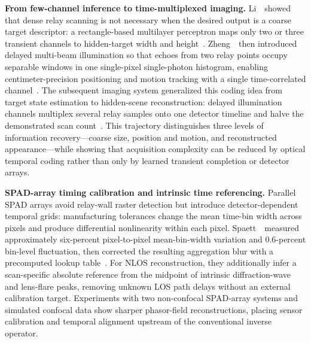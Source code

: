 \vspace{0.8mm}
\noindent \textbf{From few-channel inference to time-multiplexed imaging.}
Li~\etal~showed that dense relay scanning is not necessary when the desired output is a coarse target descriptor: a rectangle-based multilayer perceptron maps only two or three transient channels to hidden-target width and height~\cite{liFewChannelSizeNLOS2024}. Zheng~\etal~then introduced delayed multi-beam illumination so that echoes from two relay points occupy separable windows in one single-pixel single-photon histogram, enabling centimeter-precision positioning and motion tracking with a single time-correlated channel~\cite{zhengSingleChannelTimeMultiplexNLOS2024}. The subsequent imaging system generalized this coding idea from target state estimation to hidden-scene reconstruction: delayed illumination channels multiplex several relay samples onto one detector timeline and halve the demonstrated scan count~\cite{liTimeMultiplexingNLOS2025}. This trajectory distinguishes three levels of information recovery---coarse size, position and motion, and reconstructed appearance---while showing that acquisition complexity can be reduced by optical temporal coding rather than only by learned transient completion or detector arrays.


\vspace{0.8mm}
\noindent \textbf{SPAD-array timing calibration and intrinsic time referencing.}
Parallel SPAD arrays avoid relay-wall raster detection but introduce detector-dependent temporal grids: manufacturing tolerances change the mean time-bin width across pixels and produce differential nonlinearity within each pixel. Spaett~\etal~measured approximately six-percent pixel-to-pixel mean-bin-width variation and 0.6-percent bin-level fluctuation, then corrected the resulting aggregation blur with a precomputed lookup table~\cite{spaettSPADTimingNLOS2026}. For NLOS reconstruction, they additionally infer a scan-specific absolute reference from the midpoint of intrinsic diffraction-wave and lens-flare peaks, removing unknown LOS path delays without an external calibration target. Experiments with two non-confocal SPAD-array systems and simulated confocal data show sharper phasor-field reconstructions, placing sensor calibration and temporal alignment upstream of the conventional inverse operator.

